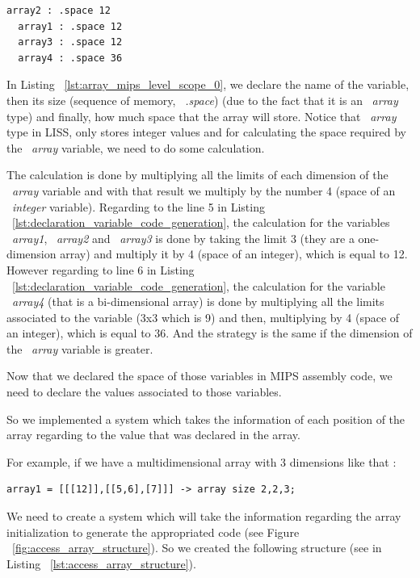 \documentclass[
  oneside,
  11pt, a4paper,
  footinclude=true,
  headinclude=true,
  cleardoublepage=empty
]{scrbook}
\begin{document}
\begin{lstlisting}[caption={Code generation of array variables in MIPS assembly code},label={lst:array_mips_level_scope_0}]
  array2 : .space 12		
  array1 : .space 12		
  array3 : .space 12		
  array4 : .space 36		
\end{lstlisting}

In Listing ~\ref{lst:array_mips_level_scope_0}, we declare the name of the variable, then its size (sequence of memory, ~\textit{.space}) (due to the fact that it is an ~\textit{array} type) and finally, how much space that the array will store.
Notice that ~\textit{array} type in LISS, only stores integer values and for calculating the space required by the ~\textit{array} variable, we need to do some calculation. 

The calculation is done by multiplying all the limits of each dimension of the ~\textit{array} variable and with that result we multiply by the number 4 (space of an ~\textit{integer} variable).
Regarding to the line 5 in Listing ~\ref{lst:declaration_variable_code_generation}, the calculation for the variables ~\textit{array1}, ~\textit{array2} and ~\textit{array3} is done by taking the limit 3 (they are a one-dimension array) and multiply it by 4 (space of an integer), which is equal to 12.
However regarding to line 6 in Listing ~\ref{lst:declaration_variable_code_generation}, the calculation for the variable ~\textit{array4} (that is a bi-dimensional array) is done by multiplying all the limits associated to the variable (3x3 which is 9) and then, multiplying by 4 (space of an integer), which is equal to 36. And the strategy is the same if the dimension of the ~\textit{array} variable is greater.

Now that we declared the space of those variables in MIPS assembly code, we need to declare the values associated to those variables.

So we implemented a system which takes the information of each position of the array regarding to the value that was declared in the array.

For example, if we have a multidimensional array with 3 dimensions like that :

\begin{lstlisting}[caption={Example of an array with 3 dimensions},label={lst:array_with_3_dimension_example}]
  array1 = [[[12]],[[5,6],[7]]] -> array size 2,2,3;
\end{lstlisting}

We need to create a system which will take the information regarding the array initialization to generate the appropriated code (see Figure ~\ref{fig:access_array_structure}). So we created the following structure (see in Listing ~\ref{lst:access_array_structure}).
\end{document}
